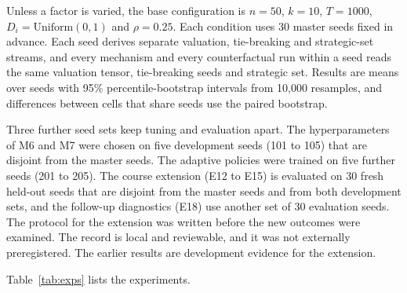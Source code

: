 \documentclass{article}
\theoremstyle{plain}
\theoremstyle{definition}
\begin{document}
Unless a factor is varied, the base configuration is $n=50$, $k=10$, $T=1000$, $D_i=\mathrm{Uniform}(0,1)$ and $\rho=0.25$.
Each condition uses 30 master seeds fixed in advance.
Each seed derives separate valuation, tie-breaking and strategic-set streams, and every mechanism and every counterfactual run within a seed reads the same valuation tensor, tie-breaking seeds and strategic set.
Results are means over seeds with 95\% percentile-bootstrap intervals from 10{,}000 resamples, and differences between cells that share seeds use the paired bootstrap.

Three further seed sets keep tuning and evaluation apart.
The hyperparameters of M6 and M7 were chosen on five development seeds (101 to 105) that are disjoint from the master seeds.
The adaptive policies were trained on five further seeds (201 to 205).
The course extension (E12 to E15) is evaluated on 30 fresh held-out seeds that are disjoint from the master seeds and from both development sets, and the follow-up diagnostics (E18) use another set of 30 evaluation seeds.
The protocol for the extension was written before the new outcomes were examined.
The record is local and reviewable, and it was not externally preregistered.
The earlier results are development evidence for the extension.

Table~\ref{tab:exps} lists the experiments.
\end{document}
